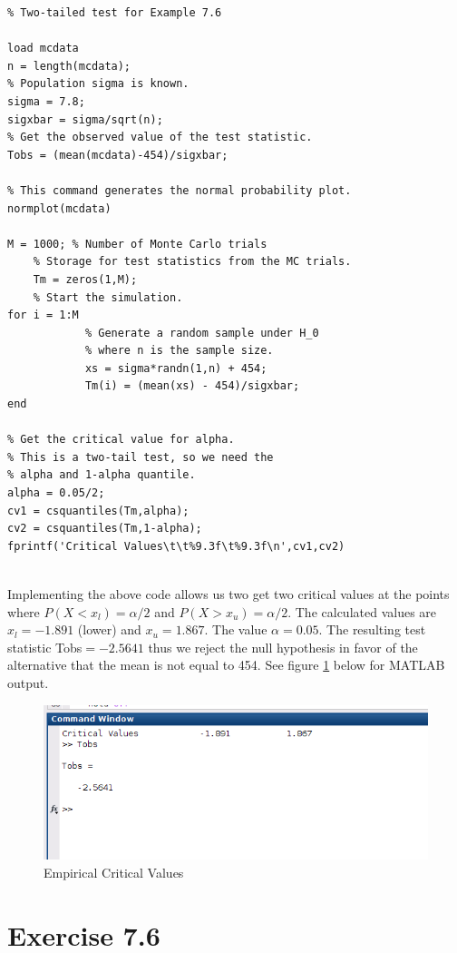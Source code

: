 \documentclass[12pt,a4paper]{article}
\begin{document}
\begin{verbatim}
% Two-tailed test for Example 7.6 

load mcdata
n = length(mcdata);  								
% Population sigma is known.
sigma = 7.8;					
sigxbar = sigma/sqrt(n);
% Get the observed value of the test statistic.
Tobs = (mean(mcdata)-454)/sigxbar;

% This command generates the normal probability plot.
normplot(mcdata)

M = 1000; % Number of Monte Carlo trials
	% Storage for test statistics from the MC trials.
	Tm = zeros(1,M);
	% Start the simulation.
for i = 1:M
			% Generate a random sample under H_0
			% where n is the sample size.
			xs = sigma*randn(1,n) + 454;
			Tm(i) = (mean(xs) - 454)/sigxbar;
end

% Get the critical value for alpha.
% This is a two-tail test, so we need the
% alpha and 1-alpha quantile.
alpha = 0.05/2;
cv1 = csquantiles(Tm,alpha);
cv2 = csquantiles(Tm,1-alpha);
fprintf('Critical Values\t\t%9.3f\t%9.3f\n',cv1,cv2)


\end{verbatim}

Implementing the above code allows us two get two critical values at the points where $P(X<x_l)=\alpha/2$ and $P(X>x_u)=\alpha/2$. The calculated values are $x_l=-1.891$ (lower) and $x_u=1.867$. The value $\alpha=0.05$. The resulting test statistic Tobs$=-2.5641$ thus we reject the null hypothesis in favor of the alternative that the mean is not equal to 454.  See figure \ref{q7p5 fig1} below for MATLAB output.

\begin{figure}[ht!]
\begin{center}
\includegraphics[scale=.75]{q7p5_result.png}
\caption{Empirical Critical Values}
\label{q7p5 fig1}
\end{center}
\end{figure}
\FloatBarrier

\section*{Exercise 7.6}
\end{document}
